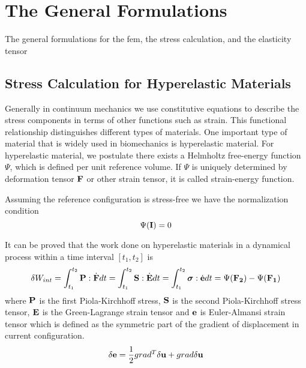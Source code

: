 \section{The General Formulations}
The general formulations for the fem, the stress calculation, and the elasticity tensor

\subsection{Stress Calculation for Hyperelastic Materials}
Generally in continuum mechanics we use constitutive equations to describe the stress components in terms of other functions such as strain. This functional relationship distinguishes different types of materials. One important type of material that is widely used in biomechanics is hyperelastic material. For hyperelastic material, we postulate there exists a Helmholtz free-energy function $\Psi$, which is defined per unit reference volume. If $\Psi$ is uniquely determined by deformation tensor $\bold{F}$ or other strain tensor, it is called strain-energy function.

Assuming the reference configuration is stress-free we have the normalization condition
\begin{equation}
\Psi(\bold I) = 0
\end{equation}

It can be proved that the work done on hyperelastic materials in a dynamical process within a time interval $[t_1, t_2]$ is
\begin{equation}
\delta{W_{int}} = \int_{t_1}^{t_2}\bold{P}:\dot{\bold{F}}dt = \int_{t_1}^{t_2}\bold{S}:\dot{\bold{E}}dt = 
\int_{t_1}^{t_2}\boldsymbol{\sigma}:\dot{\bold{e}}dt = \Psi({\bold{F_2}}) - \Psi({\bold{F_1}})
\end{equation}
where $\bold{P}$ is the first Piola-Kirchhoff stress, $\bold{S}$ is the second Piola-Kirchhoff stress tensor, $\bold{E}$ is the Green-Lagrange strain tensor and $\bold{e}$ is Euler-Almansi strain tensor which is defined as the symmetric part of the gradient of displacement in current configuration.
\begin{equation}
\delta\bold{e} = \frac{1}{2}{ grad^T\delta\bold{u} + grad\delta\bold{u}}
\end{equation}

